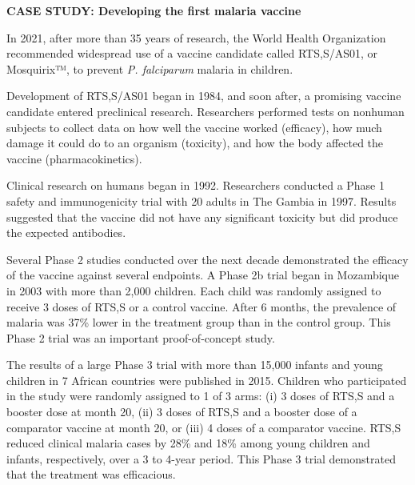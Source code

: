 \documentclass[
  letterpaper,
  DIV=11,
  numbers=noendperiod,
  oneside]{scrartcl}
\begin{document}
\begin{blackbox}

\begin{center}
\textbf{CASE STUDY: Developing the first malaria vaccine}

\end{center}

\vspace{.2cm}

In 2021, after more than 35 years of research, the World Health
Organization recommended widespread use of a vaccine candidate called
RTS,S/AS01, or Mosquirix™, to prevent \emph{P. falciparum} malaria in
children.

\vspace{.2cm}

Development of RTS,S/AS01 began in 1984, and soon after, a promising
vaccine candidate entered preclinical research. Researchers performed
tests on nonhuman subjects to collect data on how well the vaccine
worked (efficacy), how much damage it could do to an organism
(toxicity), and how the body affected the vaccine (pharmacokinetics).

\vspace{.2cm}

Clinical research on humans began in 1992. Researchers conducted a Phase
1 safety and immunogenicity trial with 20 adults in The Gambia in 1997.
Results suggested that the vaccine did not have any significant toxicity
but did produce the expected antibodies.

\vspace{.2cm}

Several Phase 2 studies conducted over the next decade demonstrated the
efficacy of the vaccine against several endpoints. A Phase 2b trial
began in Mozambique in 2003 with more than 2,000 children. Each child
was randomly assigned to receive 3 doses of RTS,S or a control vaccine.
After 6 months, the prevalence of malaria was 37\% lower in the
treatment group than in the control group. This Phase 2 trial was an
important proof-of-concept study.

\vspace{.2cm}

The results of a large Phase 3 trial with more than 15,000 infants and
young children in 7 African countries were published in 2015. Children
who participated in the study were randomly assigned to 1 of 3 arms: (i)
3 doses of RTS,S and a booster dose at month 20, (ii) 3 doses of RTS,S
and a booster dose of a comparator vaccine at month 20, or (iii) 4 doses
of a comparator vaccine. RTS,S reduced clinical malaria cases by 28\%
and 18\% among young children and infants, respectively, over a 3 to
4-year period. This Phase 3 trial demonstrated that the treatment was
efficacious.


\end{blackbox}
\end{document}
